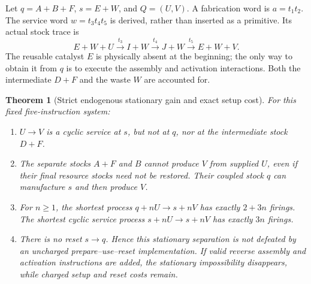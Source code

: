 \documentclass[11pt]{article}
\newtheorem{theorem}{Theorem}[section]
\theoremstyle{definition}
\theoremstyle{remark}
\begin{document}
Let $q=A+B+F$, $s=E+W$, and $Q=(U,V)$. A fabrication word is $a=t_1t_2$. The service word $w=t_3t_4t_5$ is derived, rather than inserted as a primitive. Its actual stock trace is
\[
 E+W+U\xrightarrow{t_3}I+W
 \xrightarrow{t_4}J+W
 \xrightarrow{t_5}E+W+V.
\]
The reusable catalyst $E$ is physically absent at the beginning; the only way to obtain it from $q$ is to execute the assembly and activation interactions. Both the intermediate $D+F$ and the waste $W$ are accounted for.

\begin{theorem}[Strict endogenous stationary gain and exact setup cost]\label{er:thm:example}
For this fixed five-instruction system:
\begin{enumerate}
\item $U\to V$ is a cyclic service at $s$, but not at $q$, nor at the intermediate stock $D+F$.
\item The separate stocks $A+F$ and $B$ cannot produce $V$ from supplied $U$, even if their final resource stocks need not be restored. Their coupled stock $q$ can manufacture $s$ and then produce $V$.
\item For $n\geq1$, the shortest process $q+nU\to s+nV$ has exactly $2+3n$ firings. The shortest cyclic service process $s+nU\to s+nV$ has exactly $3n$ firings.
\item There is no reset $s\to q$. Hence this stationary separation is not defeated by an uncharged prepare--use--reset implementation. If valid reverse assembly and activation instructions are added, the stationary impossibility disappears, while charged setup and reset costs remain.
\end{enumerate}
\end{theorem}
\end{document}
